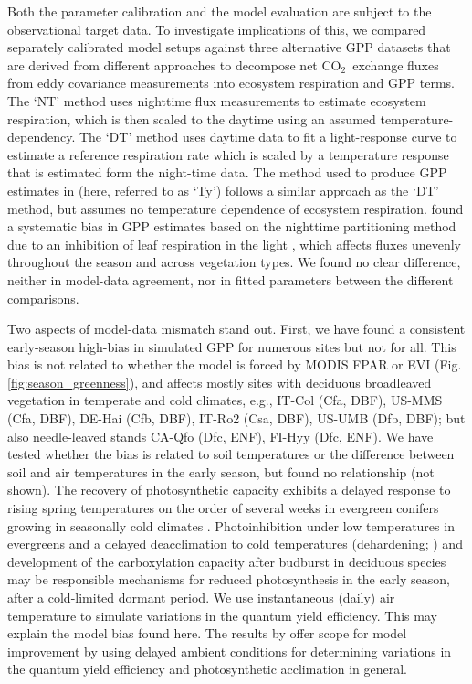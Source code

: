 \documentclass{myreport}
\newcommand{\coo}{CO$_2$}
\begin{document}
Both the parameter calibration and the model evaluation are subject to the observational target data. To investigate implications of this, we compared separately calibrated model setups against three alternative GPP datasets that are derived from different approaches to decompose net \coo\ exchange fluxes from eddy covariance measurements into ecosystem respiration and GPP terms. The `NT' method \citep{Reichstein2005-mp} uses nighttime flux measurements to estimate ecosystem respiration, which is then scaled to the daytime using an assumed temperature-dependency. The `DT' method \citep{lasslop10} uses daytime data to fit a light-response curve to estimate a reference respiration rate which is scaled by a temperature response that is estimated form the night-time data. The method used to produce GPP estimates in \cite{wang17rs} (here, referred to as `Ty') follows a similar approach as the `DT' method, but assumes no temperature dependence of ecosystem respiration. \cite{keenan19natee} found a systematic bias in GPP estimates based on the nighttime partitioning method due to an inhibition of leaf respiration in the light \citep{kok49, wehr16}, which affects fluxes unevenly throughout the season and across vegetation types. We found no clear difference, neither in model-data agreement, nor in fitted parameters between the different comparisons.

Two aspects of model-data mismatch stand out. First, we have found a consistent early-season high-bias in simulated GPP for numerous sites but not for all. This bias is not related to whether the model is forced by MODIS FPAR or EVI (Fig. \ref{fig:season_greenness}), and affects mostly sites with deciduous broadleaved vegetation in temperate and cold climates, e.g., IT-Col (Cfa, DBF), US-MMS (Cfa, DBF), DE-Hai (Cfb, DBF), IT-Ro2 (Csa, DBF), US-UMB (Dfb, DBF); but also needle-leaved stands CA-Qfo (Dfc, ENF), FI-Hyy (Dfc, ENF). We have tested whether the bias is related to soil temperatures or the difference between soil and air temperatures in the early season, but found no relationship (not shown). The recovery of photosynthetic capacity exhibits a delayed response to rising spring temperatures on the order of several weeks in evergreen conifers growing in seasonally cold climates
\citep{pelkonen80, bergh98, makela04}. Photoinhibition under low temperatures in evergreens \citep{huner93} and a delayed deacclimation to cold temperatures (dehardening; \cite{vitasse14}) and development of the carboxylation capacity after budburst in deciduous species may be responsible mechanisms for reduced photosynthesis in the early season, after a cold-limited dormant period. We use instantaneous (daily) air temperature to simulate variations in the quantum yield efficiency. This may explain the model bias found here. The results by \cite{makela04} offer scope for model improvement by using delayed ambient conditions for determining variations in the quantum yield efficiency and photosynthetic acclimation in general.
\end{document}
